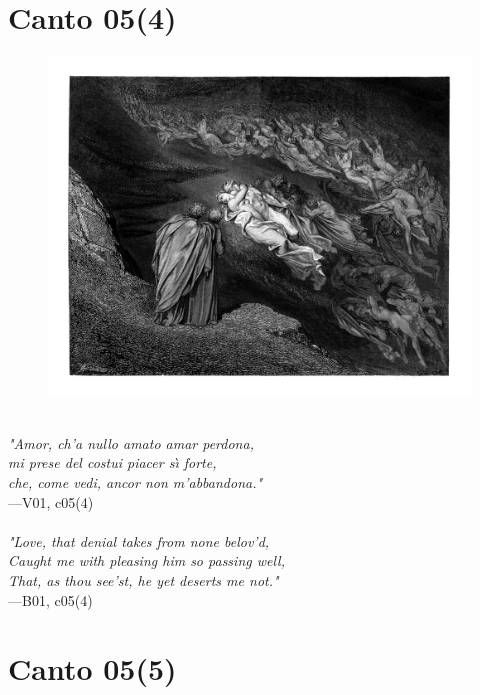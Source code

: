 \documentclass[../Dore_vision.tex]{subfiles}
\begin{document}
\newpage

\section{Canto 05(4)}

\begin{figure}[ht]
\centering
\includegraphics[height=\figsize]{illustrations/book_1/V01, c05(4).jpg}
\end{figure}

\begin{center}
\begin{minipage}{0.8\linewidth}
\textit{\\
"Amor, ch’a nullo amato amar perdona,\\mi prese del costui piacer s\`{\i} forte,\\che, come vedi, ancor non m’abbandona."} \\
—V01, c05(4) \\~\\
\textit{"Love, that denial takes from none belov'd,\\Caught me with pleasing him so passing well,\\That, as thou see'st, he yet deserts me not."} \\
—B01, c05(4)
\end{minipage}
\end{center}

\newpage

\section{Canto 05(5)}
\end{document}
